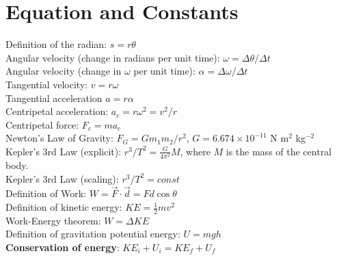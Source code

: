 \documentclass[10pt]{article}
\begin{document}
\maketitle
\small
\section{Equation and Constants}
Definition of the radian: $s = r \theta$ \\
Angular velocity (change in radians per unit time): $\omega = \Delta \theta/\Delta t$ \\
Angular velocity (change in $\omega$ per unit time): $\alpha = \Delta \omega/\Delta t$ \\
Tangential velocity: $v = r\omega$ \\
Tangential acceleration $a = r\alpha$ \\
Centripetal acceleration: $a_c = r\omega^2 = v^2/r$ \\
Centripetal force: $F_c = m a_c$ \\
Newton's Law of Gravity: $F_G = G m_1 m_2 / r^2$, $G = 6.674\times 10^{-11}$ N m$^2$ kg$^{-2}$ \\
Kepler's 3rd Law (explicit): $r^3/T^2 = \frac{G}{4\pi^2} M$, where $M$ is the mass of the central body. \\
Kepler's 3rd Law (scaling): $r^3/T^2 = const$ \\
Definition of Work: $W = \vec{F} \cdot \vec{d} = Fd\cos\theta$ \\
Definition of kinetic energy: $KE = \frac{1}{2} mv^2$ \\
Work-Energy theorem: $W = \Delta KE$ \\
Definition of gravitation potential energy: $U = mgh$ \\
\textbf{Conservation of energy}: $KE_i + U_i = KE_f + U_f$
\end{document}
